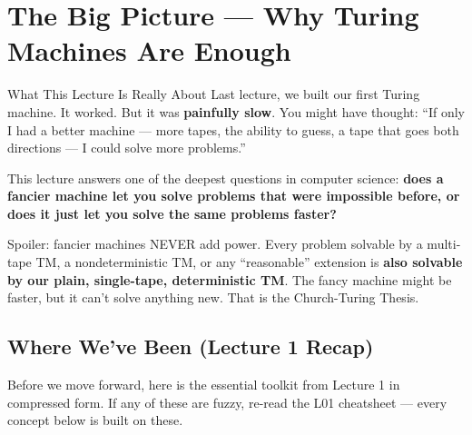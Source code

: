 \section{The Big Picture --- Why Turing Machines Are Enough}

\begin{conceptbox}{What This Lecture Is Really About}
Last lecture, we built our first Turing machine. It worked. But it was \textbf{painfully slow}. You might have thought: ``If only I had a better machine --- more tapes, the ability to guess, a tape that goes both directions --- I could solve more problems.''

This lecture answers one of the deepest questions in computer science: \textbf{does a fancier machine let you solve problems that were impossible before, or does it just let you solve the same problems faster?}

Spoiler: fancier machines NEVER add power. Every problem solvable by a multi-tape TM, a nondeterministic TM, or any ``reasonable'' extension is \textbf{also solvable by our plain, single-tape, deterministic TM}. The fancy machine might be faster, but it can't solve anything new. That is the Church-Turing Thesis.
\end{conceptbox}

\subsection{Where We've Been (Lecture 1 Recap)}

Before we move forward, here is the essential toolkit from Lecture 1 in compressed form. If any of these are fuzzy, re-read the L01 cheatsheet --- every concept below is built on these.

